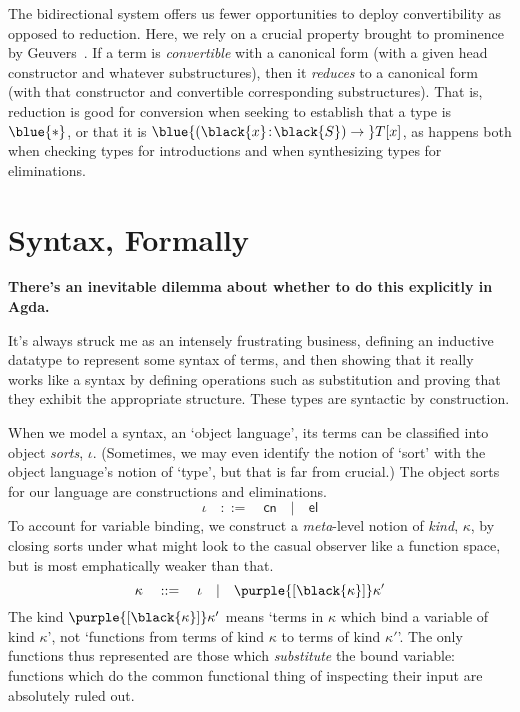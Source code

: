 \documentclass[natbib]{article}
\newcommand{\type}{\blue{\ast}}
\newcommand{\hb}{\!:\!}
\newcommand{\PI}[2]{\blue{(\black{#1}\hb \black{#2})\to\;}}
\newcommand{\V}[1]{\purple{\mathit{#1}}}
\begin{document}
The bidirectional system offers us fewer opportunities to deploy
convertibility as opposed to reduction. Here, we rely on a crucial
property brought to prominence by Geuvers~\cite{geuvers:dunnoyet}. If
a term is \emph{convertible} with a canonical form (with a given head
constructor and whatever substructures), then it \emph{reduces} to a
canonical form (with that constructor and convertible corresponding
substructures). That is, reduction is good for conversion when seeking
to establish that a type is $\type$, or that it is $\PI xS T[x]$, as
happens both when checking types for introductions and when
synthesizing types for eliminations.



\newpage
\appendix


\section{Syntax, Formally}

\newcommand{\cns}{\mathsf{cn}}
\newcommand{\elm}{\mathsf{el}}
\newcommand{\bnd}[1]{\purple{[\black{#1}]}}
\newcommand{\bv}[1]{\V{#1}.\,}
\newcommand{\pic}{\blue{\Uppi}}
\newcommand{\lac}{\red{\uplambda}}
\newcommand{\elc}{\green{\upupsilon}}
\newcommand{\apc}{\green{\upalpha}}
\newcommand{\tyc}{\green{\upepsilon}}

\textbf{There's an inevitable dilemma about whether to do this explicitly in Agda.}

It's always struck me as an intensely frustrating business, defining an inductive datatype to represent some syntax of terms, and then showing that it really works like a syntax by defining operations such as substitution and proving that they exhibit the appropriate structure. These types are syntactic by construction.

When we model a syntax, an `object language', its terms can be classified into object \emph{sorts}, $\iota$. (Sometimes, we may even identify the notion of `sort' with the object language's notion of `type', but that is far from crucial.) The object sorts for our language are constructions and eliminations.
\[
  \iota \quad::=\quad \cns \quad|\quad \elm
\]
To account for variable binding, we construct a \emph{meta}-level notion of \emph{kind}, $\kappa$, by closing sorts under what might look to the casual observer like a function space, but is most emphatically weaker than that.
\[
  \kappa \quad::=\quad \iota \quad|\quad \bnd\kappa \kappa'
\]
The kind $\bnd\kappa \kappa'$ means `terms in $\kappa$ which bind a variable of kind $\kappa$', not `functions from terms of kind $\kappa$ to terms of kind $\kappa'$'. The only functions thus represented are those which
\emph{substitute} the bound variable: functions which do the common functional thing of inspecting their input are absolutely ruled out.
\end{document}
